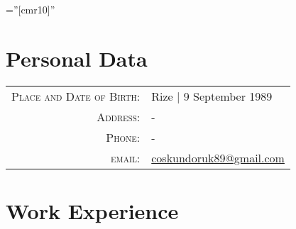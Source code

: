 \documentclass[a4paper,10pt]{article} %
\begin{document}
\pagestyle{empty} %

\font\fb=''[cmr10]'' %


\par{\bigskip\par} %

\section{Personal Data}

\begin{tabular}{rl}
\textsc{Place and Date of Birth:} & Rize | 9 September 1989 \\
\textsc{Address:} & -
 \\
\textsc{Phone:} & - \\
\textsc{email:} & \href{mailto:coskundoruk89@gmail.com}{coskundoruk89@gmail.com}
\end{tabular}



\section{Work Experience}
\end{document}
